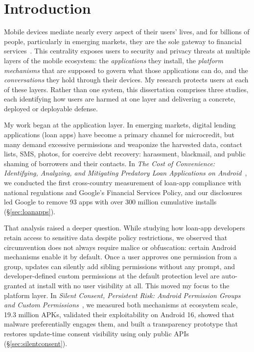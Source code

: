 \documentclass[letterpaper,11pt]{article}
\begin{document}

\section{Introduction}
\label{sec:intro}

Mobile devices mediate nearly every aspect of their users' lives, and
for billions of people, particularly in emerging markets, they are the
sole gateway to financial services~\cite{suri2016mpesa,findex2021}.
This centrality exposes users to security and privacy threats at
multiple layers of the mobile ecosystem: the \emph{applications} they
install, the \emph{platform mechanisms} that are supposed to govern
what those applications can do, and the \emph{conversations} they hold
through their devices. My research protects users at each of these
layers. Rather than one system, this dissertation comprises three
studies, each identifying how users are harmed at one layer and
delivering a concrete, deployed or deployable defense.

My work began at the application layer. In emerging markets, digital
lending applications (loan apps) have become a primary channel for
microcredit, but many demand excessive permissions and weaponize the
harvested data, contact lists, SMS, photos, for coercive debt
recovery: harassment, blackmail, and public shaming of borrowers and
their contacts. In \emph{The Cost of Convenience: Identifying,
Analyzing, and Mitigating Predatory Loan Applications on
Android}~\cite{akanji2026cost}, we conducted the first cross-country
measurement of loan-app compliance with national regulations and
Google's Financial Services Policy, and our disclosures led Google to
remove 93 apps with over 300 million cumulative installs
(\S\ref{sec:loanapps}).

That analysis raised a deeper question. While studying how loan-app
developers retain access to sensitive data despite policy
restrictions, we observed that circumvention does not always require
malice or obfuscation: certain Android mechanisms enable it by
default. Once a user approves one permission from a group, updates can
silently add sibling permissions without any prompt, and developer-defined
custom permissions at the default protection level are auto-granted at
install with no user visibility at all. This moved my focus to the
platform layer. In \emph{Silent Consent, Persistent Risk: Android
Permission Groups and Custom Permissions}~\cite{akanji2026silent}, we
measured both mechanisms at ecosystem scale, 19.3 million APKs,
validated their exploitability on Android 16, showed that malware
preferentially engages them, and built a transparency prototype that
restores update-time consent visibility using only public APIs
(\S\ref{sec:silentconsent}).
\end{document}
